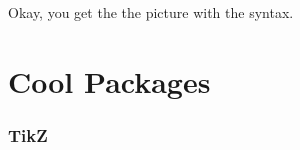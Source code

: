 \documentclass[12pt]{beamer}
\begin{document}
\begin{frame}[plain]
\centerline{Okay, you get the the picture with the syntax.}
\end{frame}
\section{Cool Packages}

\begin{frame}[plain]
\frametitle{TikZ}

\end{frame}


\end{document}
